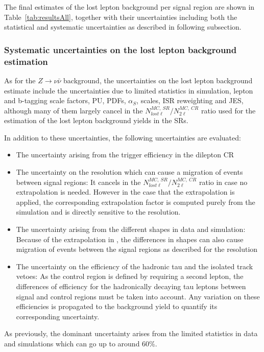The final estimates of the lost lepton background per signal region are shown in Table~\ref{tab:resultsAll}, together with their uncertainties including both the statistical and systematic uncertainties as described in following subsection.

\subsubsection{Systematic uncertainties on the lost lepton background estimation}

As for the $Z \to \nu \bar{\nu}$ background, the uncertainties on the lost lepton background estimate include the uncertainties due to limited statistics in simulation, lepton and b-tagging scale factors, PU,  PDFs, $\alpha_{S}$, scales, ISR reweighting and JES, although many of them largely cancel in the $N^{MC,~SR}_{lost \ell}/ N^{MC,~CR}_{2\ell}$ ratio used for the estimation of the lost lepton background yields in the SRs.

In addition to these uncertainties, the following uncertainties are evaluated:
\begin{itemize} 
\item The uncertainty arising from the trigger efficiency in the dilepton CR
\item The uncertainty on the \MET resolution which can cause a migration of events between signal regions: It cancels in the $N^{MC,~SR}_{lost \ell}/ N^{MC,~CR}_{2\ell}$ ratio in case no \MET extrapolation is needed. However in the case that the \MET extrapolation is applied, the corresponding extrapolation factor is computed purely from the simulation and is directly sensitive to the \MET resolution.
\item The uncertainty arising from the different \MET shapes in data and simulation: Because of the extrapolation in \MET, the differences in \MET shapes  can also cause migration of events between the signal regions as described for the \MET resolution
\item The uncertainty on the efficiency of the hadronic tau and the isolated track vetoes: As the control region is defined by requiring a second lepton, the differences of efficiency for the hadronically decaying tau leptons between signal and control regions must be taken into account. Any variation on these  efficiencies is propagated to the background yield to quantify its corresponding uncertainty.
\end{itemize}
As previously, the dominant uncertainty arises from the limited statistics in data and simulations which can go up to around 60\%.


